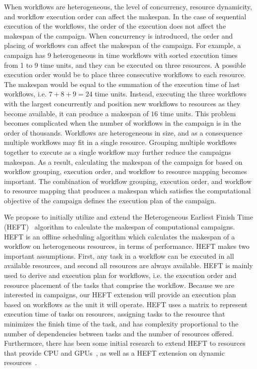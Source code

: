 When workflows are heterogeneous, the level of concurrency, resource dynamicity, and workflow execution order can affect the makespan.
In the case of sequential execution of the workflows, the order of the execution does not affect the makespan of the campaign.
When concurrency is introduced, the order and placing of workflows can affect the makespan of the campaign.
For example, a campaign has 9 heterogeneous in time workflows with sorted execution times from 1 to 9 time units, and they can be executed on three resources.
A possible execution order would be to place three consecutive workflows to each resource.
The makespan would be equal to the summation of the execution time of last workflows, i.e. $7 + 8 + 9 = 24$ time units.
Instead, executing the three workflows with the largest concurrently and position new workflows to resources as they become available, it can produce a makespan of $16$ time units.
This problem becomes complicated when the number of workflows in the campaign is in the order of thousands.
Workflows are heterogeneous in size, and as a consequence multiple workflows may fit in a single resource.
Grouping multiple workflows together to execute as a single workflow may further reduce the campaigns makespan.
As a result, calculating the makespan of the campaign for based on workflow grouping, execution order, and workflow to resource mapping becomes important.
The combination of workflow grouping, execution order, and workflow to resource mapping that produces a makespan which satisfies the computational objective of the campaign defines the execution plan of the campaign.

We propose to initially utilize and extend the Heterogeneous Earliest Finish Time (HEFT)~\cite{topcuoglu2002performance} algorithm to calculate the makespan of computational campaigns.
HEFT is an offline scheduling algorithm which calculates the makespan of a workflow on heterogeneous resources, in terms of performance.
HEFT makes two important assumptions.
First, any task in a workflow can be executed in all available resources, and second all resources are always available.
HEFT is mainly used to derive and execution plan for workflows, i.e. the execution order and resource placement of the tasks that comprise the workflow.
Because we are interested in campaigns, our HEFT extension will provide an execution plan based on workflows as the unit it will operate.
HEFT uses a matrix to represent execution time of tasks on resources, assigning tasks to the resource that minimizes the finish time of the task, and has complexity proportional to the number of dependencies between tasks and the number of resources offered.
Furthermore, there has been some initial research to extend HEFT to resources that provide CPU and GPUs~\cite{shetti2013optimization}, as well as a HEFT extension on dynamic resources~\cite{dong2007pfas}.

